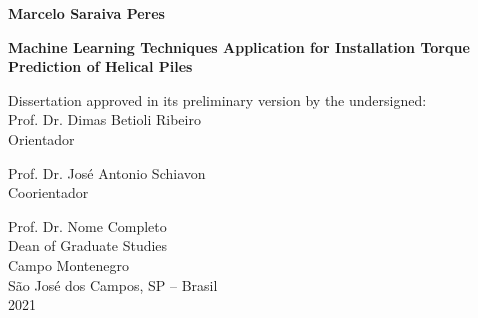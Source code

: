 
\begin{titlepage}
\begin{onehalfspace}


\vspace*{2cm}


\begin{center}
\textbf{\large{}Marcelo Saraiva Peres\\}{\large}
\vspace*{2cm}

  \textbf{\large{}Machine Learning Techniques Application for Installation Torque Prediction of Helical Piles\\}{\large}
\vspace*{2cm}


Dissertation approved in its preliminary version by the undersigned:\\

\vspace*{2cm}
                        Prof. Dr. Dimas Betioli Ribeiro\\
                              Orientador\\
\vspace*{1cm}

                     Prof. Dr. Jos{\'e} Antonio Schiavon\\
                           Coorientador \\
\vspace*{1cm}

                          Prof. Dr. Nome Completo\\
                         Dean of Graduate Studies  \\

\vfill
Campo Montenegro\\
São Jos{\'e} dos Campos, SP – Brasil\\
2021

\end{center}
\end{onehalfspace}
\end{titlepage}


